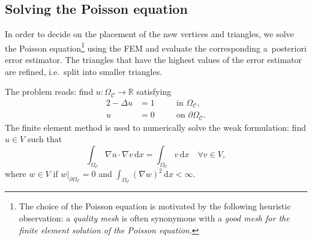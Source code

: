 \documentclass[11pt]{article}
\begin{document}
\subsection{Solving the Poisson equation}
\label{sec:poisson}

In order to decide on the placement of the new vertices and triangles, we solve
the Poisson equation\footnote{The choice of the Poisson equation is motivated by
the following heuristic observation: a \emph{quality mesh} is often synonymous
with a \emph{good mesh for the finite element solution of the Poisson
equation}.} using the FEM and evaluate the corresponding a~posteriori error
estimator.  The triangles that have the highest values of the error estimator
are refined, i.e.~split into smaller triangles.

The problem reads: find $u : \Omega_{\mathcal{C}} \rightarrow \mathbb{R}$ satisfying
\begin{alignat}{2}
-\Delta u &= 1 \quad && \text{in $\Omega_{\mathcal{C}}$,} \\
u &= 0 \quad && \text{on $\partial \Omega_{\mathcal{C}}$.}
\end{alignat}
The finite element method is used to numerically solve the
weak formulation: find \(u \in V\) such that
\begin{equation}
   \label{eq:weakform}
   \int_{\Omega_{\mathcal{C}}} \nabla u \cdot \nabla v \,\mathrm{d}x = \int_{\Omega_{\mathcal{C}}} v\,\mathrm{d}x \quad \forall v \in V,
\end{equation}
where
\(w \in V\) if \(w |_{\partial \Omega_{\mathcal{C}}} = 0\) and
$
   \int_{\Omega_{\mathcal{C}}} (\nabla w)^2 \,\mathrm{d}x < \infty.
$
\end{document}
